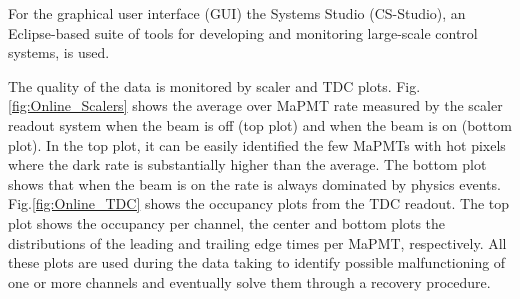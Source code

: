 \documentclass[5p,times,twocolumn]{elsarticle}
\begin{document}
For the graphical user interface (GUI) the Systems Studio (CS-Studio), 
an Eclipse-based suite of tools for developing and monitoring large-scale control systems, is used. 
 

The quality of the data is monitored by scaler and TDC plots. 
Fig. \ref{fig:Online_Scalers} shows the average over MaPMT rate measured by the scaler readout system when the beam is off (top plot) and when the beam is on (bottom plot).
In the top plot, it can be easily identified the few MaPMTs with hot pixels where the dark rate is substantially higher than the average.
The bottom plot shows that when the beam is on the rate is always dominated by physics events. 
Fig.\ref{fig:Online_TDC} shows the occupancy plots from the TDC readout. The top plot shows the occupancy per channel, the center and bottom plots the distributions of the leading and trailing edge times per MaPMT, respectively.
All these plots are used during the data taking to identify possible malfunctioning of one or more channels and eventually solve them through a recovery procedure.
\end{document}

